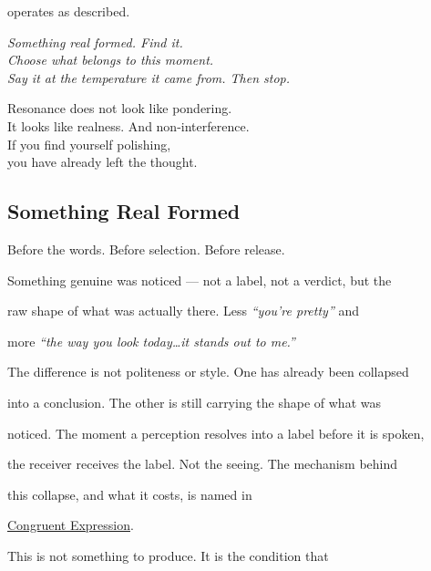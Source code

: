 \documentclass[12pt, a4paper]{article}
\begin{document}
operates as described.

\begin{center}

\emph{Something real formed. Find it.\\
Choose what belongs to this moment.\\
Say it at the temperature it came from. Then stop.}

\end{center}

\begin{calloutbox}

Resonance does not look like pondering.\\

It looks like realness. And non-interference.\\[0.6em]

If you find yourself polishing,\\

you have already left the thought.

\end{calloutbox}


\subsection{Something Real Formed}

Before the words. Before selection. Before release.

Something genuine was noticed --- not a label, not a verdict, but the

raw shape of what was actually there. Less \textit{``you're pretty''} and

more \textit{``the way you look today\ldots it stands out to me.''}

The difference is not politeness or style. One has already been collapsed

into a conclusion. The other is still carrying the shape of what was

noticed. The moment a perception resolves into a label before it is spoken,

the receiver receives the label. Not the seeing. The mechanism behind

this collapse, and what it costs, is named in

\hyperref[subsec:congruent_expression]{Congruent Expression}.

This is not something to produce. It is the condition that
\end{document}
